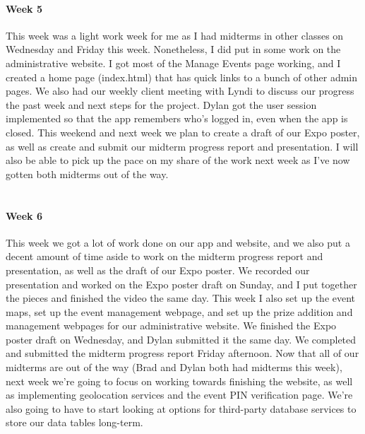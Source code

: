 \documentclass[onecolumn, draftclsnofoot,10pt, compsoc]{IEEEtran}
\begin{document}
      \paragraph{Week 5}
      This week was a light work week for me as I had midterms in other classes on Wednesday and Friday this week. Nonetheless, I did put in some work on the administrative website. I got most of the Manage Events page working, and I created a home page (index.html) that has quick links to a bunch of other admin pages. We also had our weekly client meeting with Lyndi to discuss our progress the past week and next steps for the project. Dylan got the user session implemented so that the app remembers who's logged in, even when the app is closed. This weekend and next week we plan to create a draft of our Expo poster, as well as create and submit our midterm progress report and presentation. I will also be able to pick up the pace on my share of the work next week as I've now gotten both midterms out of the way. \\ \\

      \paragraph{Week 6}
      This week we got a lot of work done on our app and website, and we also put a decent amount of time aside to work on the midterm progress report and presentation, as well as the draft of our Expo poster. We recorded our presentation and worked on the Expo poster draft on Sunday, and I put together the pieces and finished the video the same day. This week I also set up the event maps, set up the event management webpage, and set up the prize addition and management webpages for our administrative website. We finished the Expo poster draft on Wednesday, and Dylan submitted it the same day. We completed and submitted the midterm progress report Friday afternoon. Now that all of our midterms are out of the way (Brad and Dylan both had midterms this week), next week we're going to focus on working towards finishing the website, as well as implementing geolocation services and the event PIN verification page. We're also going to have to start looking at options for third-party database services to store our data tables long-term. \\ \\
\end{document}
